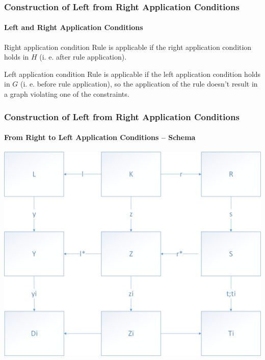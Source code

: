 \documentclass[32pt,t]{beamer}
\begin{document}
	\begin{frame}
		\frametitle{Construction of Left from Right Application Conditions}
		\framesubtitle{Left and Right Application Conditions}
		\begin{block}{Right application condition}
			Rule is applicable if the right application condition holds in $H$ (i. e. after rule application).
		\end{block}
		\begin{block}{Left application condition}
			Rule is applicable if the left application condition holds in $G$ (i. e. before rule application), so the application of the rule doesn't result in a graph violating one of the constraints.
		\end{block}
	\end{frame}

	\begin{frame}
		\frametitle{Construction of Left from Right Application Conditions}
		\framesubtitle{From Right to Left Application Conditions -- Schema}
		\centering
		\includegraphics[height=.8\textheight]{Images/50_RightAC-To-LeftAC_Schema}
	\end{frame}
	
\end{document}
